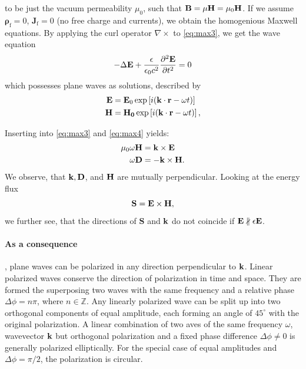 to be just the vacuum permeability $\mu_0$, such that
$\mathbf{B} = \mu \mathbf{H} = \mu_0 \mathbf{H}$. 
If we assume $\mathbf{\rho}_\text{f} = 0$, $\mathbf{J}_\text{f} = 0$ 
(no free charge and currents), we obtain the homogenious 
Maxwell equations. By applying the curl operator $\nabla \times$ 
to \eqref{eq:max3}, we get the wave equation 
\begin{equation}
    - \Delta \mathbf{E} + \frac{\epsilon}{\epsilon_0 c^2} \frac{\partial^2 \mathbf{E}}{\partial t^2}  = 0
    \label{eq:wave_eq}
\end{equation}
which possesses plane waves as solutions, 
described by
\begin{subequations}
\begin{align}
    \mathbf{E} &= \mathbf{E}_0 \exp \left[i(\mathbf{k \cdot r}-\omega t)\right] \\
    \mathbf{H} &= \mathbf{H_0} \exp \left[i(\mathbf{k \cdot r}-\omega t)\right], 
\end{align}
\end{subequations}

Inserting into \eqref{eq:max3} and \eqref{eq:max4} yields:
\begin{subequations}
\begin{align}
    \mu_0 \omega \mathbf{H} &= \mathbf{k} \times \mathbf{E} 
    \label{eq:plan_H} \\
    \omega \mathbf{D} &= - \mathbf{k} \times \mathbf{H}.
    \label{eq:plan_D} 
\end{align}
\end{subequations}
We observe, that $\mathbf{k}, \mathbf{D}$, and $\mathbf{H}$ are mutually perpendicular. 
Looking at the energy flux
\begin{equation}
    \mathbf{S} = \mathbf{E} \times \mathbf{H}, 
\end{equation}
we further see, that the directions of $\mathbf{S}$ and $\mathbf{k}$ do not 
coincide if $\mathbf{E} \nparallel \mathbf{\epsilon} \mathbf{E}$. 

\paragraph{As a consequence}, 
plane waves can be polarized in any direction 
perpendicular to $\mathbf{k}$. Linear polarized waves conserve the 
direction of polarization in time and space. They are formed 
the superposing two waves with the same frequency and a 
relative phase $\Delta \phi = n \pi$, where $n \in \mathbb{Z}$. 
Any linearly polarized wave can be split up into two orthogonal 
components of equal amplitude, each forming an angle of $45^\circ$ 
with the original polarization.
A linear combination of two aves of the same frequency $\omega$, 
wavevector $\mathbf{k}$ but orthogonal polarization and a fixed phase 
difference $\Delta \phi \neq 0$ is generally polarized elliptically.
For the special case of equal amplitudes and $\Delta \phi = \pi /2$,
the polarization is circular. 

